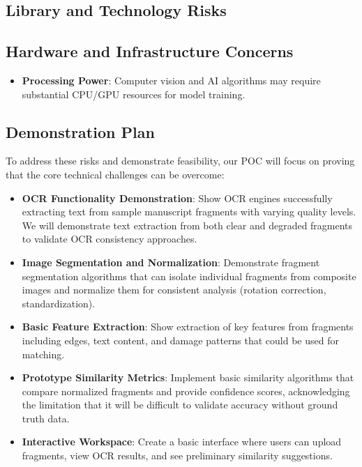 \documentclass{article}
\begin{document}
\subsection{Library and Technology Risks}

\subsection{Hardware and Infrastructure Concerns}

\begin{itemize}
\item \textbf{Processing Power}: Computer vision and AI algorithms may require substantial CPU/GPU resources for model training.
\end{itemize}

\subsection{Demonstration Plan}

To address these risks and demonstrate feasibility, our POC will focus on proving that the core technical challenges can be overcome:

\begin{itemize}
\item \textbf{OCR Functionality Demonstration}: Show OCR engines successfully extracting text from sample manuscript fragments with varying quality levels. We will demonstrate text extraction from both clear and degraded fragments to validate OCR consistency approaches.
\item \textbf{Image Segmentation and Normalization}: Demonstrate fragment segmentation algorithms that can isolate individual fragments from composite images and normalize them for consistent analysis (rotation correction, standardization).
\item \textbf{Basic Feature Extraction}: Show extraction of key features from fragments including edges, text content, and damage patterns that could be used for matching.
\item \textbf{Prototype Similarity Metrics}: Implement basic similarity algorithms that compare normalized fragments and provide confidence scores, acknowledging the limitation that it will be difficult to validate accuracy without ground truth data.
\item \textbf{Interactive Workspace}: Create a basic interface where users can upload fragments, view OCR results, and see preliminary similarity suggestions.
\end{itemize}
\end{document}
